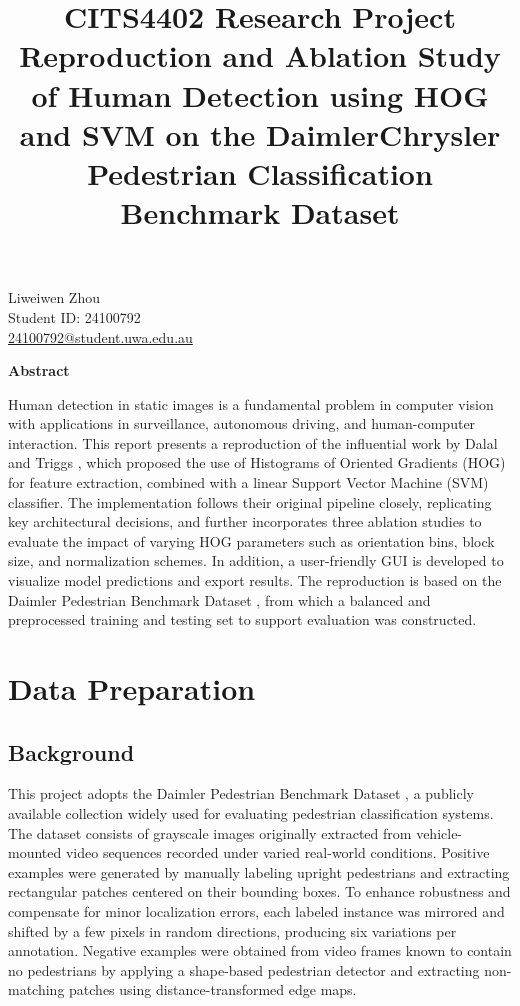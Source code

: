 \documentclass[10pt, onecolumn, a4paper]{article}
\title{\textbf{CITS4402 Research Project} 
\\[0.5em] \Large Reproduction and Ablation Study of Human Detection using HOG and SVM on the DaimlerChrysler Pedestrian Classification Benchmark Dataset}
\author{}
\date{}
\begin{document}
\maketitle

\vspace{-7em}
\begin{center}
{\large Liweiwen Zhou} \\
{\small Student ID: 24100792} \\
{\small \href{mailto:24100792@student.uwa.edu.au}{24100792@student.uwa.edu.au}}
\end{center}
\vspace{-0.5em}

\centerline{\large \textbf{Abstract}}
\vspace{0.5em}
\noindent
 Human detection in static images is a fundamental problem in computer vision with applications in surveillance, 
 autonomous driving, and human-computer interaction. 
 This report presents a reproduction of the influential work by Dalal and Triggs \cite{1467360}, 
 which proposed the use of Histograms of Oriented Gradients (HOG) for feature extraction, combined with a linear Support Vector Machine (SVM) classifier. 
 The implementation follows their original pipeline closely, replicating key architectural decisions, 
 and further incorporates three ablation studies to evaluate the impact of varying HOG parameters such as orientation bins, 
 block size, and normalization schemes. 
 In addition, a user-friendly GUI is developed to visualize model predictions and export results. 
 The reproduction is based on the Daimler Pedestrian Benchmark Dataset \cite{1704841}, 
 from which a balanced and preprocessed training and testing set to support evaluation was constructed.

\vspace{0.5em}
\section{Data Preparation}
\vspace{0.5em}
\subsection{Background}
\vspace{-0.5em}
This project adopts the Daimler Pedestrian Benchmark Dataset \cite{1704841}, 
a publicly available collection widely used for evaluating pedestrian classification systems. 
The dataset consists of grayscale images originally extracted from vehicle-mounted video sequences recorded under varied real-world conditions. 
Positive examples were generated by manually labeling upright pedestrians and extracting rectangular patches centered on their bounding boxes. 
To enhance robustness and compensate for minor localization errors, each labeled instance was mirrored and shifted by a few pixels in random directions, 
producing six variations per annotation. 
Negative examples were obtained from video frames known to contain no pedestrians by applying a shape-based pedestrian detector and 
extracting non-matching patches using distance-transformed edge maps.
\end{document}
